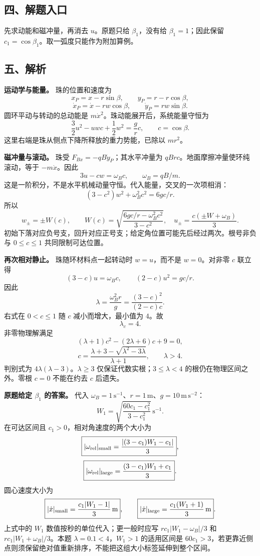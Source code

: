 \documentclass[12pt,a4paper,UTF8]{ctexart}
\begin{document}
\subsection{四、解题入口}\label{ux56dbux89e3ux9898ux5165ux53e3-7}

先求动能和磁冲量，再消去 \(u\)。原题只给 \(\beta_1\)，没有给
\(\beta_1=1\)；因此保留 \(c_1=\cos\beta_1\)。取一弧度只能作为附加算例。

\subsection{五、解析}\label{ux4e94ux89e3ux6790-7}

\textbf{运动学与能量。} 珠的位置和速度为 \[
x_P=x-r\sin\beta,\qquad y_P=r-r\cos\beta,
\] \[
\dot x_P=\dot x-rw\cos\beta,\qquad \dot y_P=rw\sin\beta.
\] 圆环平动与转动的总动能是 \(m\dot x^2\)。珠动能展开后，系统能量守恒为
\[
\frac32u^2-uwc+\frac12w^2=\frac grc,\qquad c=\cos\beta.
\] 这里右端是珠从侧点下降所释放的重力势能，已除以 \(mr^2\)。

\textbf{磁冲量与滚动。} 珠受 \(F_{Bx}=-qB\dot y_P\)；其水平冲量为
\(qBr c\)。地面摩擦冲量使环纯滚动，等于 \(-m\dot x\)。因此 \[
3u-cw=\omega_Bc,\qquad \omega_B=qB/m.
\] 这是一阶积分，不是水平机械动量守恒。代入能量，交叉的一次项相消： \[
(3-c^2)w^2+\omega_B^2c^2=6gc/r.
\] 所以 \[
w_\pm=\pm W(c),\qquad
W(c)=\sqrt{\frac{6gc/r-\omega_B^2c^2}{3-c^2}},
\quad
u_\pm=\frac{c(\pm W+\omega_B)}3.
\]
初始下落对应负号支，回升对应正号支；给定角位置可能先后经过两次。根号非负与
\(0\le c\le1\) 共同限制可达位置。

\textbf{再次相对静止。} 珠随环材料点一起转动时 \(w=u\)，而不是
\(w=0\)。对非零 \(c\) 联立得 \[
(3-c)u=\omega_Bc,\qquad (2-c)u^2=gc/r.
\] 因此 \[
\lambda=\frac{\omega_B^2r}{g}
=\frac{(3-c)^2}{(2-c)c}.
\] 右式在 \(0<c\le1\) 随 \(c\) 减小而增大，最小值为 \(4\)。故 \[
\boxed{\lambda_c=4}.
\] 非零物理解满足 \[
(\lambda+1)c^2-(2\lambda+6)c+9=0,
\] \[
\boxed{c=\frac{\lambda+3-\sqrt{\lambda^2-3\lambda}}{\lambda+1}},\qquad \lambda>4.
\] 判别式为 \(4\lambda(\lambda-3)\)。\(\lambda\ge3\)
仅保证代数实根；\(3\le\lambda<4\) 的根仍在物理区间之外。零根 \(c=0\)
不能在约去 \(c\) 后遗失。

\textbf{原题给定 \(\beta_1\) 的答案。} 代入
\(\omega_B=1\,\mathrm{s^{-1}}\)、\(r=1\,\mathrm m\)、\(g=10\,\mathrm{m\,s^{-2}}\)：
\[
W_1=\sqrt{\frac{60c_1-c_1^2}{3-c_1^2}}\,\mathrm{s^{-1}}.
\] 在可达区间且 \(c_1>0\)，相对角速度的两个大小为 \[
\boxed{|\omega_{\rm rel}|_{\rm small}
=\frac{|(3-c_1)W_1-c_1|}{3}},
\] \[
\boxed{|\omega_{\rm rel}|_{\rm large}
=\frac{(3-c_1)W_1+c_1}{3}}.
\] 圆心速度大小为 \[
\boxed{|\dot x|_{\rm small}=\frac{c_1|W_1-1|}3\,\mathrm m},
\qquad
\boxed{|\dot x|_{\rm large}=\frac{c_1(W_1+1)}3\,\mathrm m}.
\] 上式中的 \(W_1\) 数值按秒的单位代入；更一般时应写
\(r c_1|W_1-\omega_B|/3\) 和 \(r c_1|W_1+\omega_B|/3\)。本题
\(\lambda=0.1<4\)，\(W_1>1\) 的适用区间是
\(60c_1>3\)，若更靠近侧点则须保留绝对值重新排序，不能把这组大小标签延伸到整个区间。
\end{document}
